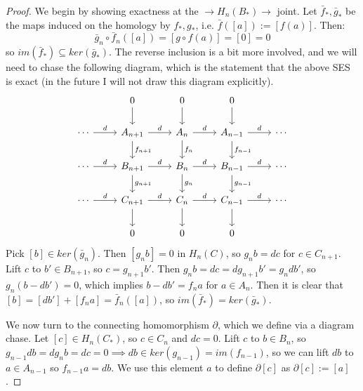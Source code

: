 \documentclass[11pt, oneside]{amsart}   	%
\theoremstyle{definition}
\begin{document}
\begin{proof}
	We begin by showing exactness at the $\rightarrow H_n(B_*)\rightarrow$ joint. Let $\bar f_*, \bar g_*$ be the 
	maps induced on the homology by $f_*, g_*$, i.e. $\bar f([a]) := [f(a)]$. Then: 
	\begin{equation}
		\bar g_n\circ\bar f_n ([a]) = [g\circ f(a)] = [0] = 0
	\end{equation}
	so $im(\bar f_*)\subseteq ker(\bar g_*)$. The reverse inclusion is a bit more involved, and we will need to chase the 
	following diagram, which is the statement that the above SES is exact (in the future I will not draw this diagram 
	explicitly). 
	\begin{equation}\begin{tikzcd}
		& 0\arrow[d] & 0\arrow[d] & 0\arrow[d] & \\
		\cdots\arrow[r, "d"] & A_{n + 1}\arrow[r, "d"]\arrow[d, "f_{n + 1}"] & A_n\arrow[r, "d"]\arrow[d, "f_{n}"] & A_{n - 1}
		\arrow[r, "d"]\arrow[d, "f_{n - 1}"] & \cdots \\
		\cdots\arrow[r, "d"] & B_{n + 1}\arrow[r, "d"]\arrow[d, "g_{n + 1}"] & B_n\arrow[r, "d"]\arrow[d, "g_n"] & B_{n - 1}
		\arrow[r, "d"]\arrow[d, "g_{n - 1}"] & \cdots \\
		\cdots\arrow[r, "d"] & C_{n + 1}\arrow[r, "d"]\arrow[d] & C_n\arrow[r, "d"]\arrow[d] & C_{n - 1}\arrow[r, "d"]\arrow[d] & 
		\cdots \\
		& 0 & 0 & 0 &
	\end{tikzcd} \end{equation}
	Pick $[b]\in ker(\bar g_n)$. Then $[g_nb] = 0$ in $H_n(C)$, so $g_nb = dc$ for $c\in C_{n + 1}$. Lift $c$ to $b'\in B_{n + 
	1}$, so $c = g_{n + 1}b'$. Then $g_nb = dc = dg_{n + 1} b' = g_n db'$, so $g_n(b - db') = 0$, which implies $b - db' = 
	f_n a$ for $a\in A_n$. Then it is clear that $[b] = [db'] + [f_n a] = \bar f_n([a])$, so $im(\bar f_*) = ker(\bar g_*)$. 
	
	We now turn to the connecting homomorphism $\partial$, which we define via a diagram chase. Let $[c]\in H_n(C_*)$, 
	so $c\in C_n$ and $dc = 0$. Lift $c$ to $b\in B_n$, so $g_{n - 1} db = d g_n b = dc = 0\implies db\in ker(g_{n - 1}) = 
	im(f_{n - 1})$, so we can lift $db$ to $a\in A_{n - 1}$ so $f_{n - 1}a = db$. We use this element $a$ to define 
	$\partial[c]$ as $\partial [c] := [a]$. 
	

\end{proof}
\end{document}
